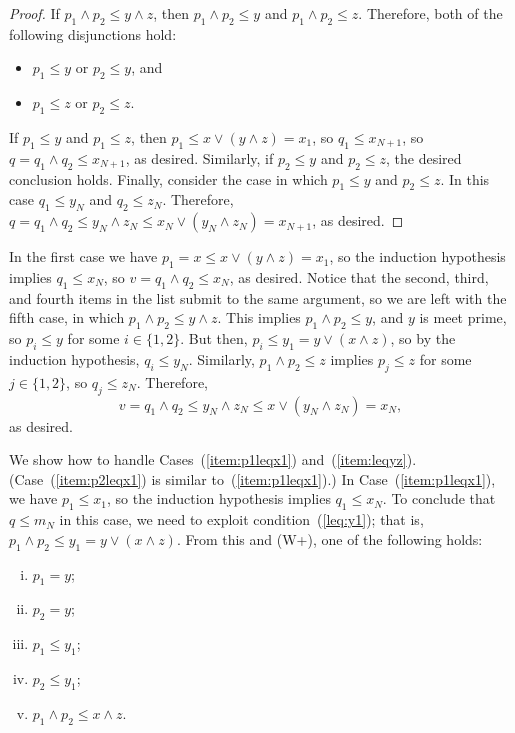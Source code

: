 \begin{proof}
If $p_1 \wedge p_2 \leq y \wedge z$, then 
$p_1 \wedge p_2 \leq y$ and $p_1 \wedge p_2 \leq z$. Therefore, both of the following disjunctions hold:
\begin{itemize}
  \item $p_1 \leq y$ or $p_2 \leq y$, and 
  \item $p_1 \leq z$ or $p_2 \leq z$. 
\end{itemize}
If $p_1 \leq y$ and $p_1 \leq z$, then $p_1 \leq x \vee (y\wedge z) = x_1$, so $q_1 \leq x_{N+1}$, so $q = q_1\wedge q_2 \leq x_{N+1}$, as desired.
Similarly, if $p_2 \leq y$ and $p_2 \leq z$, the desired conclusion holds.
Finally, consider the case in which $p_1 \leq y$ and $p_2 \leq z$. In this case $q_1 \leq y_N$ and $q_2 \leq z_N$.  Therefore, $q = q_1 \wedge q_2 \leq y_N \wedge z_N \leq x_N \vee (y_N\wedge z_N) = x_{N+1}$, as desired.
\end{proof}





  In the first case we have $p_1 = x \leq x \vee (y \wedge z) = x_1$, so
  the induction hypothesis implies $q_1\leq x_N$, so $v = q_1\wedge q_2\leq x_N$, as desired.  Notice that the second, third, and fourth items in the list submit to the same argument, so we are left with the fifth case, 
  in which $p_1\wedge p_2 \leq y \wedge z$. 
  This implies $p_1\wedge p_2 \leq y$, and $y$ is meet prime, so 
  $p_i\leq y$ for some $i\in \{1,2\}$.  But then, $p_i \leq y_1 = y\vee (x\wedge z)$, so by the induction hypothesis, $q_i \leq y_N$.
  Similarly, $p_1\wedge p_2 \leq z$ implies 
  $p_j\leq z$ for some $j\in \{1,2\}$, so $q_j \leq z_N$.
  Therefore, 
  \[
  v = q_1\wedge q_2 \leq y_N \wedge z_N \leq x \vee (y_N\wedge z_N) = x_N,\] 
  as desired.



  
  We show how to handle Cases~(\ref{item:p1leqx1}) and~(\ref{item:leqyz}). (Case~(\ref{item:p2leqx1}) is similar to~(\ref{item:p1leqx1}).)
  In Case~(\ref{item:p1leqx1}), we have
  $p_1\leq x_1$, so the induction hypothesis implies $q_1 \leq x_N$. To 
  conclude that $q \leq m_N$ in this case, we need to exploit condition~(\ref{leq:y1}); that is, 
  $p_1\wedge p_2 \leq y_1 = y \vee (x \wedge z)$. From this and (W+),
  one of the following holds:
  \begin{enumerate}[(i)]
    \item   $p_1=y$;
    \item   $p_2=y$;
    \item   $p_1\leq y_1$;
    \item   $p_2 \leq y_1$;
    \item   $p_1\wedge p_2 \leq x \wedge z$.  
  \end{enumerate}

